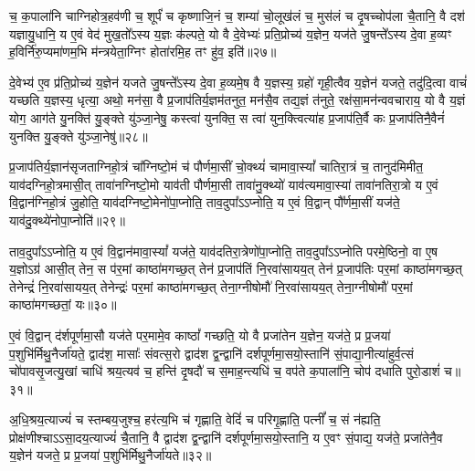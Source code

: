च॒ क॒पाला॑नि चाग्निहोत्र॒हव॑णी च॒ शूर्पं॑ च कृष्णाजि॒नं च॒ शम्या॑ चो॒लूख॑लं च॒ मुस॑लं च दृ॒षच्चोप॑ला चै॒तानि॒ वै दश॑ यज्ञायु॒धानि॒ य ए॒वं वेद॑ मुख॒तो᳚\-ऽस्य य॒ज्ञः क॑ल्पते॒ यो वै दे॒वेभ्यः॑ प्रति॒प्रोच्य॑ य॒ज्ञेन॒ यज॑ते जु॒षन्ते᳚\-ऽस्य दे॒वा ह॒व्यꣳ ह॒विर्नि॑रु॒प्यमा॑णम॒भि म॑न्त्रयेता॒ग्निꣳ होता॑रमि॒ह तꣳ हु॑व॒ इति॑॥२७॥

दे॒वेभ्य॑ ए॒व प्र॑ति॒प्रोच्य॑ य॒ज्ञेन॑ यजते जु॒षन्ते᳚\-ऽस्य दे॒वा ह॒व्यमे॒ष वै य॒ज्ञस्य॒ ग्रहो॑ गृही॒त्वैव य॒ज्ञेन॑ यजते॒ तदु॑दि॒त्वा वाचं॑ यच्छति य॒ज्ञस्य॒ धृत्या॒ अथो॒ मन॑सा॒ वै प्र॒जाप॑तिर्य॒ज्ञम॑तनुत॒ मन॑सै॒व तद्य॒ज्ञं त॑नुते॒ रक्ष॑सा॒मन॑न्ववचाराय॒ यो वै य॒ज्ञं योग॒ आग॑ते यु॒नक्ति॑ यु॒ङ्क्ते यु॑ञ्जा॒नेषु॒ कस्त्वा॑ युनक्ति॒ स त्वा॑ युन॒क्त्वित्या॑ह प्र॒जाप॑ति॒र्वै कः प्र॒जाप॑तिनै॒वैनं॑ युनक्ति यु॒ङ्क्ते यु॑ञ्जा॒नेषु॑॥२८॥

{\anuvakamend[{वै मनः॒ स्फ्य इति॑ युन॒क्त्वेका॑दश च॥८॥}]}

प्र॒जाप॑तिर्य॒ज्ञान॑सृजताग्निहो॒त्रं चा᳚ग्निष्टो॒मं च॑ पौर्णमा॒सीं चो॒क्थ्यं॑ चामावा॒स्यां᳚ चातिरा॒त्रं च॒ तानुद॑मिमीत॒ याव॑दग्निहो॒त्रमासी॒त् तावा॑नग्निष्टो॒मो याव॑ती पौर्णमा॒सी तावा॑नु॒क्थ्यो॑ याव॑त्यमावा॒स्या॑ तावा॑नतिरा॒त्रो य ए॒वं वि॒द्वान॑ग्निहो॒त्रं जु॒होति॒ याव॑दग्निष्टो॒मेनो॑पा॒प्नोति॒ ताव॒दुपा᳚\-ऽ\-ऽप्नोति॒ य ए॒वं वि॒द्वान् पौ᳚र्णमा॒सीं यज॑ते॒ याव॑दु॒क्थ्ये॑नोपा॒प्नोति॑॥२९॥

ताव॒दुपा᳚\-ऽ\-ऽप्नोति॒ य ए॒वं वि॒द्वान॑मावा॒स्यां᳚ यज॑ते॒ याव॑दतिरा॒त्रेणो॑पा॒प्नोति॒ ताव॒दुपा᳚\-ऽ\-ऽप्नोति परमे॒ष्ठिनो॒ वा ए॒ष य॒ज्ञो\-ऽग्र॑ आसी॒त् तेन॒ स प॑र॒मां काष्ठा॑मगच्छ॒त् तेन॑ प्र॒जाप॑तिं नि॒रवा॑सायय॒त् तेन॑ प्र॒जाप॑तिः पर॒मां काष्ठा॑मगच्छ॒त् तेनेन्द्रं॑ नि॒रवा॑सायय॒त् तेनेन्द्रः॑ पर॒मां काष्ठा॑मगच्छ॒त् तेना॒ग्नीषोमौ॑ नि॒रवा॑सायय॒त् तेना॒ग्नीषोमौ॑ पर॒मां काष्ठा॑मगच्छतां॒ यः॥३०॥

ए॒वं वि॒द्वान् द॑र्\mbox{}शपूर्णमा॒सौ यज॑ते पर॒मामे॒व काष्ठां᳚ गच्छति॒ यो वै प्रजा॑तेन य॒ज्ञेन॒ यज॑ते॒ प्र प्र॒जया॑ प॒शुभि॑र्मिथु॒नैर्जा॑यते॒ द्वाद॑श॒ मासाः᳚ संवत्स॒रो द्वाद॑श द्व॒न्द्वानि॑ दर्\mbox{}शपूर्णमा॒सयो॒स्तानि॑ सं॒पाद्या॒नीत्या॑हुर्व॒त्सं चो॑पावसृ॒जत्यु॒खां चाधि॑ श्रय॒त्यव॑ च॒ हन्ति॑ दृ॒षदौ॑ च स॒माह॒न्त्यधि॑ च॒ वप॑ते क॒पाला॑नि॒ चोप॑ दधाति पुरो॒डाशं॑ च॥३१॥

अ॒धि॒श्रय॒त्याज्यं॑ च स्तम्बय॒जुश्च॒ हर॑त्य॒भि च॑ गृह्णाति॒ वेदिं॑ च परिगृ॒ह्णाति॒ पत्नीं᳚ च॒ सं न॑ह्यति॒ प्रोक्ष॑णीश्चा\-ऽ\-ऽसा॒दय॒त्याज्यं॑ चै॒तानि॒ वै द्वाद॑श द्व॒न्द्वानि॑ दर्\mbox{}शपूर्णमा॒सयो॒स्तानि॒ य ए॒वꣳ सं॒पाद्य॒ यज॑ते॒ प्रजा॑तेनै॒व य॒ज्ञेन॑ यजते॒ प्र प्र॒जया॑ प॒शुभि॑र्मिथु॒नैर्जा॑यते॥३२॥


